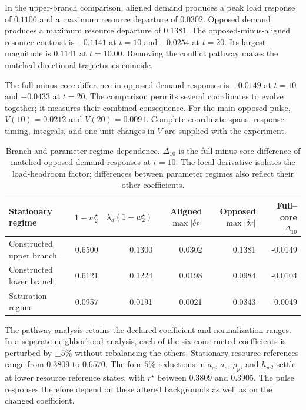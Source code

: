In the upper-branch comparison, aligned demand produces a peak load response of $0.1106$ and a maximum resource departure of $0.0302$. Opposed demand produces a maximum resource departure of $0.1381$. The opposed-minus-aligned resource contrast is $-0.1141$ at $t=10$ and $-0.0254$ at $t=20$. Its largest magnitude is $0.1141$ at $t=10.00$. Removing the conflict pathway makes the matched directional trajectories coincide.

The full-minus-core difference in opposed demand responses is $-0.0149$ at $t=10$ and $-0.0433$ at $t=20$. The comparison permits several coordinates to evolve together; it measures their combined consequence. For the main opposed pulse, $V(10)=0.0212$ and $V(20)=0.0091$. Complete coordinate spans, response timing, integrals, and one-unit changes in $V$ are supplied with the experiment.

\begin{table}[H]\centering\footnotesize

\begin{tabularx}{\textwidth}{@{}Yrrrrr@{}}\toprule

Stationary regime & $1-w_2^\star$ & $\lambda_d(1-w_2^\star)$ & Aligned $\max|\delta r|$ & Opposed $\max|\delta r|$ & Full--core $\Delta_{10}$ \\\midrule

Constructed upper branch & 0.6500 & 0.1300 & 0.0302 & 0.1381 & -0.0149 \\

Constructed lower branch & 0.6121 & 0.1224 & 0.0198 & 0.0984 & -0.0104 \\

Saturation regime & 0.0957 & 0.0191 & 0.0021 & 0.0343 & -0.0049 \\

\bottomrule\end{tabularx}

\caption{Branch and parameter-regime dependence. $\Delta_{10}$ is the full-minus-core difference of matched opposed-demand responses at $t=10$. The local derivative isolates the load-headroom factor; differences between parameter regimes also reflect their other coefficients.}\label{tab:regime-responses}\end{table}

The pathway analysis retains the declared coefficient and normalization ranges. In a separate neighborhood analysis, each of the six constructed coefficients is perturbed by $\pm5\%$ without rebalancing the others. Stationary resource references range from $0.3809$ to $0.6570$. The four $5\%$ reductions in $a_s$, $a_e$, $\rho_p$, and $h_{w2}$ settle at lower resource reference states, with $r^\star$ between $0.3809$ and $0.3905$. The pulse responses therefore depend on these altered backgrounds as well as on the changed coefficient.

